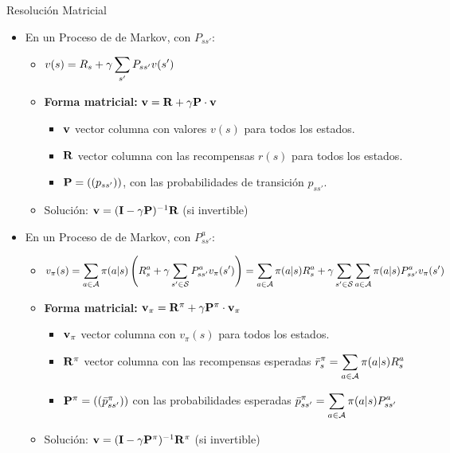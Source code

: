 \documentclass[10pt, envcountsect, handout, aspectratio=1610, hyperref={hypertexnames=true}]{beamer}
\begin{document}
\begin{frame}{Resolución Matricial}

\begin{itemize}
\item En un Proceso de  de Markov, con $P_{ss'}$:
	\begin{itemize}
	\item $\displaystyle v(s) = R_s + \gamma \sum_{s'} P_{ss'} v(s')$
	\item \textbf{Forma matricial:} $\mathbf{v} = \mathbf{R} + \gamma \mathbf{P} \cdot \mathbf{v} $
		\begin{itemize}
		\item $\mathbf{v}$ vector columna con valores $v(s)$ para todos los estados.
		\item $\mathbf{R}$ vector columna con las recompensas $r(s)$ para todos los estados.
		\item $\mathbf{P}= ((p_{ss'}))$, con las probabilidades de transición $p_{ss'}$.
		\end{itemize}
	\item Solución: $\mathbf{v} = (\mathbf{I} - \gamma \mathbf{P})^{-1} \mathbf{R}$ (si invertible)
	\end{itemize}
	
	
\item En un Proceso de  de Markov, con $P_{ss'}^a$:
	\begin{itemize}
	\item $\displaystyle v_\pi(s) = \sum_{a\in{\cal A}} \pi(a|s) \left( R^{a}_s + \gamma \sum_{s'\in{\cal S}} P^{a}_{ss'} v_\pi(s') \right) = \sum_{a\in{\cal A}} \pi(a|s)  R^{a}_s + \gamma  \sum_{s'\in{\cal S}} \sum_{a\in{\cal A}} \pi(a|s) P^{a}_{ss'} v_\pi(s')  $
	\item \textbf{Forma matricial:} $\mathbf{v}_\pi = \mathbf{R}^\pi+ \gamma \mathbf{P}^\pi \cdot \mathbf{v}_\pi $
		\begin{itemize}
		\item $\mathbf{v}_\pi$ vector columna con $v_\pi(s)$ para todos los estados. 
		\item $\mathbf{R}^{\pi}$ vector columna con las recompensas esperadas $\displaystyle \bar{r}_s^\pi = \sum_{a\in {\cal A}} \pi(a|s) R_s^a$
		\item $\mathbf{P}^{\pi}= ((\bar{p}_{ss'}^{\pi}))$ con las probabilidades esperadas $\displaystyle \bar{p}_{ss'}^{\pi} = \sum_{a\in {\cal A}} \pi(a|s) P_{ss'}^a$
		\end{itemize}
	\item Solución: $\mathbf{v} = (\mathbf{I} - \gamma \mathbf{P}^\pi)^{-1} \mathbf{R}^\pi$ (si invertible)
	\end{itemize}
	
	
\end{itemize}

\end{frame}
\end{document}
